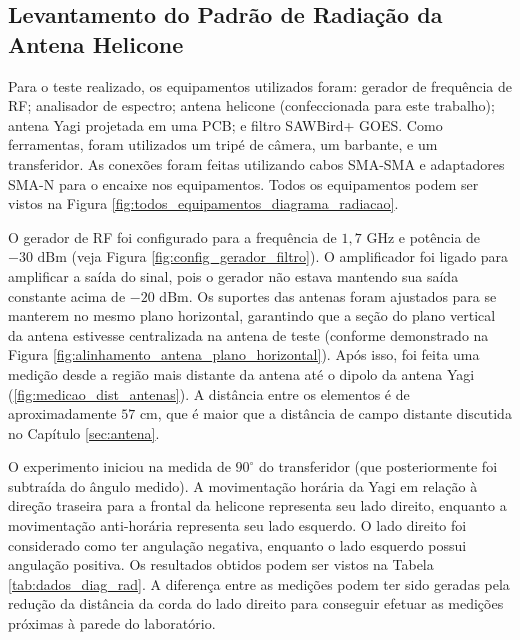 \begin{apendicesenv}
\chapter{Levantamento do Padrão de Radiação da Antena Helicone}\label{cap:apendice_teste_diagrama radiação}
Para o teste realizado, os equipamentos utilizados foram: gerador de frequência de RF; analisador de espectro; antena helicone (confeccionada para este trabalho); antena Yagi projetada em uma PCB; e filtro SAWBird+ GOES.
Como ferramentas, foram utilizados um tripé de câmera, um barbante, e um transferidor. As conexões foram feitas utilizando cabos SMA-SMA e adaptadores SMA-N para o encaixe nos equipamentos. Todos os equipamentos podem ser vistos na Figura \ref{fig:todos_equipamentos_diagrama_radiacao}.

O gerador de RF foi configurado para a frequência de $1,7 \text{ GHz}$ e potência de $-30 \text{ dBm}$ (veja Figura \ref{fig:config_gerador_filtro}). O amplificador foi ligado para amplificar a saída do sinal, pois o gerador não estava mantendo sua saída constante acima de $-20 \text{ dBm}$.
Os suportes das antenas foram ajustados para se manterem no mesmo plano horizontal, garantindo que a seção do plano vertical da antena estivesse centralizada na antena de teste (conforme demonstrado na Figura \ref{fig:alinhamento_antena_plano_horizontal}).
Após isso, foi feita uma medição desde a região mais distante da antena até o dipolo da antena Yagi (\ref{fig:medicao_dist_antenas}). A distância entre os elementos é de aproximadamente $57 \text{ cm}$, que é maior que a distância de campo distante discutida no Capítulo \ref{sec:antena}.

O experimento iniciou na medida de $90^{\circ}$ do transferidor (que posteriormente foi subtraída do ângulo medido).
A movimentação horária da Yagi em relação à direção traseira para a frontal da helicone representa seu lado direito, enquanto a movimentação anti-horária representa seu lado esquerdo.
O lado direito foi considerado como ter angulação negativa, enquanto o lado esquerdo possui angulação positiva. Os resultados obtidos podem ser vistos na Tabela \ref{tab:dados_diag_rad}.
A diferença entre as medições podem ter sido geradas pela redução da distância da corda do lado direito para conseguir efetuar as medições próximas à parede do laboratório.


\end{apendicesenv}
